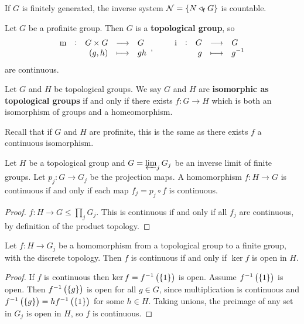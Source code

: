 \begin{corollary}
If $ G $ is finitely generated, the inverse system $ \NNN = \cbr{N \triangleleft_\f G} $ is countable.
\end{corollary}

\pagebreak

\begin{proposition}
Let $ G $ be a profinite group. Then $ G $ is a \textbf{topological group}, so
$$ \function[\m]{G \times G}{G}{\br{g, h}}{gh}, \qquad \function[\i]{G}{G}{g}{g^{-1}} $$
are continuous.
\end{proposition}

\begin{definition*}
Let $ G $ and $ H $ be topological groups. We say $ G $ and $ H $ are \textbf{isomorphic as topological groups} if and only if there exists $ f : G \to H $ which is both an isomorphism of groups and a homeomorphism.
\end{definition*}

Recall that if $ G $ and $ H $ are profinite, this is the same as there exists $ f $ a continuous isomorphism.

\begin{proposition}
\label{prop:1.2.25}
Let $ H $ be a topological group and $ G = \varprojlim_j G_j $ be an inverse limit of finite groups. Let $ p_j : G \to G_j $ be the projection maps. A homomorphism $ f : H \to G $ is continuous if and only if each map $ f_j = p_j \circ f $ is continuous.
\end{proposition}

\begin{proof}
$ f : H \to G \le \prod_j G_j $. This is continuous if and only if all $ f_j $ are continuous, by definition of the product topology.
\end{proof}

\begin{proposition}
Let $ f : H \to G_j $ be a homomorphism from a topological group to a finite group, with the discrete topology. Then $ f $ is continuous if and only if $ \ker f $ is open in $ H $.
\end{proposition}

\begin{proof}
If $ f $ is continuous then $ \ker f = f^{-1}\br{\cbr{1}} $ is open. Assume $ f^{-1}\br{\cbr{1}} $ is open. Then $ f^{-1}\br{\cbr{g}} $ is open for all $ g \in G $, since multiplication is continuous and $ f^{-1}\br{\cbr{g}} = hf^{-1}\br{\cbr{1}} $ for some $ h \in H $. Taking unions, the preimage of any set in $ G_j $ is open in $ H $, so $ f $ is continuous.
\end{proof}

